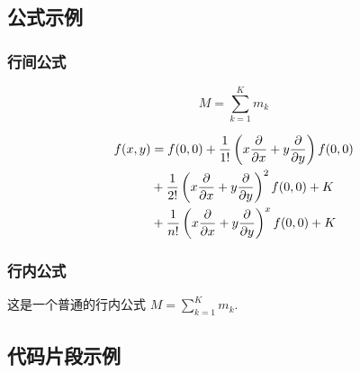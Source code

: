 \subsection{公式示例}
\subsubsection{行间公式}
\begin{equation}
    M=\sum_{k=1}^{K}m_k
\end{equation}

\begin{equation}
    \begin{aligned}
        f(x,y) & = f(0,0)+\frac{1}{1!}\left(x\diffp{}{x}+y\diffp{}{y}\right)f(0,0) \\
        & +\frac{1}{2!}\left(x\diffp{}{x}+y\diffp{}{y}\right)^2f(0,0)+K     \\
        & +\frac{1}{n!}\left(x\diffp{}{x}+y\diffp{}{y}\right)^xf(0,0)+K
    \end{aligned}
\end{equation}

\subsubsection{行内公式}
这是一个普通的行内公式 $M=\sum_{k=1}^{K}m_k$.

\subsection{代码片段示例}
\newpage